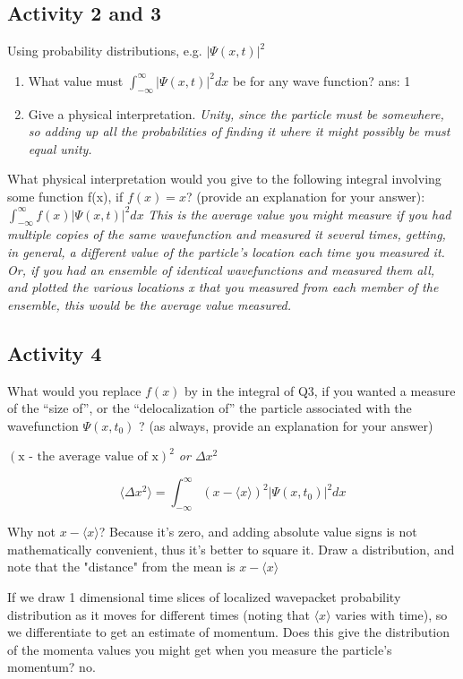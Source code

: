 \documentclass{article}
\begin{document}
\subsection{Activity 2 and 3}

Using probability distributions, e.g. $|\Psi(x,t)|^2$

\begin{enumerate}
    \item What value must $\int_{- \infty}^{\infty} |\Psi(x,t)|^2 dx$ be for any wave function? ans: 1
    \item Give a physical interpretation. \textit{Unity, since the particle must be somewhere, so adding up all the probabilities of finding it where it might possibly be must equal unity.}
\end{enumerate}

What physical interpretation would you give to the following integral involving some function f(x), if $f(x)=x$? (provide an explanation for your answer): $\int_{-\infty}^\infty f(x) |\Psi(x,t)|^2 dx $
\textit{This is the average value you might measure if you had multiple copies of the same wavefunction and measured it several times, getting, in general, a different value of the particle’s location each time you measured it. Or, if you had an ensemble of identical wavefunctions and measured them all, and plotted the various locations x that you measured from each member of the ensemble, this would be the average value measured.}

\subsection{Activity 4}

What would you replace $f(x)$ by in the integral of Q3, if you wanted a measure of the “size of”, or the “delocalization of” the particle associated with the wavefunction $\Psi(x,t_0)$ ?  (as always, provide an explanation for your answer)

\textit{$(\text{x - the average value of x})^2$ or $\Delta x^2$}

$$\langle \Delta x^2 \rangle = \int_{- \infty}^\infty (x - \langle x \rangle)^2 |\Psi(x,t_0)|^2 dx$$

Why not $x - \langle x \rangle$? Because it's zero, and adding absolute value signs is not mathematically convenient, thus it's better to square it. Draw a distribution, and note that the "distance" from the mean is $x - \langle x \rangle$

If we draw 1 dimensional time slices of localized wavepacket probability distribution as it moves for different times (noting that $\langle x \rangle$ varies with time), so we differentiate to get an estimate of momentum. Does this give the distribution of the momenta values you might get when you measure the particle's momentum? no. 
\end{document}
